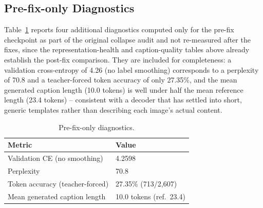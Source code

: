 \documentclass[conference]{IEEEtran}
\begin{document}
\subsection{Pre-fix-only Diagnostics}
\label{sec:results-prefix}
Table~\ref{tab:prefix-only-diagnostics} reports four additional diagnostics computed only for the pre-fix checkpoint as part of the original collapse audit and not re-measured after the fixes, since the representation-health and caption-quality tables above already establish the post-fix comparison. They are included for completeness: a validation cross-entropy of 4.26 (no label smoothing) corresponds to a perplexity of 70.8 and a teacher-forced token accuracy of only 27.35\%, and the mean generated caption length (10.0 tokens) is well under half the mean reference length (23.4 tokens) -- consistent with a decoder that has settled into short, generic templates rather than describing each image's actual content.

\begin{table}[htbp]
\centering
\caption{Pre-fix-only diagnostics.}
\label{tab:prefix-only-diagnostics}
\small
\renewcommand{\arraystretch}{1.12}
\begin{tabular}{@{}p{}p{}@{}}
\toprule
\textbf{Metric} & \textbf{Value} \\
\midrule
Validation CE (no smoothing) & 4.2598 \\
Perplexity & 70.8 \\
Token accuracy (teacher-forced) & 27.35\% (713/2,607) \\
Mean generated caption length & 10.0 tokens (ref.\ 23.4) \\
\bottomrule
\end{tabular}
\end{table}
\end{document}
